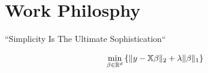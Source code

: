 \documentclass{tccv}
\begin{document}

\section{Work Philosphy}

``Simplicity Is The Ultimate Sophistication``

\vspace{0.1cm}

\begin{equation*}
  \min_{\beta \in \mathbb{R}^{d}}\left\{\|y - \mathbb{X}\beta \|_{2} + \lambda \|\beta \|_{1}\right\}\\
\end{equation*}


\vspace{0.1cm}





\end{document}
